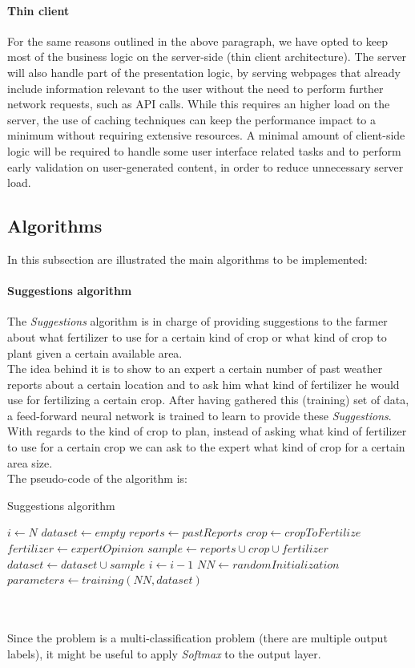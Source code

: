 \documentclass{article}
\begin{document}
\paragraph{Thin client}
For the same reasons outlined in the above paragraph, we have opted to keep most of the business logic on the server-side (thin client architecture). The server will also handle part of the presentation logic, by serving webpages that already include information relevant to the user without the need to perform further network requests, such as API calls. While this requires an higher load on the server, the use of caching techniques can keep the performance impact to a minimum without requiring extensive resources.
A minimal amount of client-side logic will be required to handle some user interface related tasks and to perform early validation on user-generated content, in order to reduce unnecessary server load.
\subsection{Algorithms}
In this subsection are illustrated the main algorithms to be implemented:
\paragraph{Suggestions algorithm}
The \textit{Suggestions} algorithm is in charge of  providing suggestions to the farmer about what fertilizer to use for a certain kind of crop or what kind of crop to plant given a certain available area.\\
The idea behind it is to show to an expert a certain number of past weather reports about a certain location and to ask him what kind of fertilizer he would use for fertilizing a certain crop. After having gathered this (training) set of data, a feed-forward neural network is trained to learn to provide these \textit{Suggestions}. With regards to the kind of crop to plan, instead of asking what kind of fertilizer to use for a certain crop we can ask to the expert what kind of crop for a certain area size.\\
The pseudo-code of the algorithm is:\\
\begin{algorithm}[H]
\caption{Suggestions algorithm}
\begin{algorithmic}
\State $i \gets N$ 
\State $dataset \gets empty$
\State $reports \gets pastReports$
\State $crop \gets cropToFertilize$
\State $fertilizer \gets expertOpinion$
\State $sample \gets reports \cup crop \cup fertilizer$
\State $dataset \gets dataset \cup sample$
\State $i \gets i-1$
\EndWhile
\State $NN \gets randomInitialization$
\State $parameters \gets training(NN,dataset)$
\end{algorithmic}
\end{algorithm}
\\\\Since the problem is a multi-classification problem (there are multiple output labels), it might be useful to apply \textit{Softmax} to the output layer.
\newpage
\end{document}

